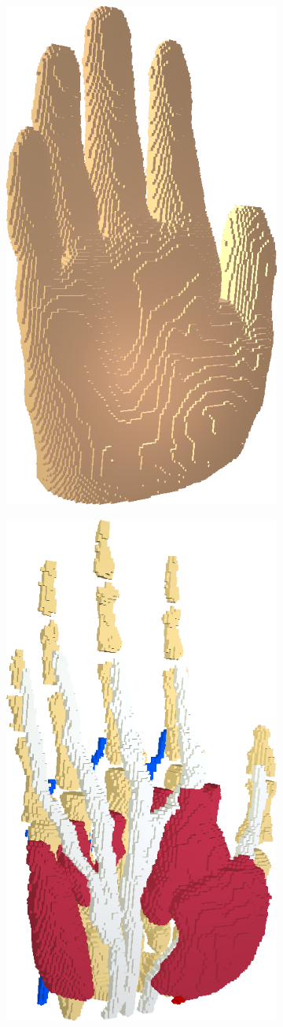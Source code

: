 {{{			\begin{figure}[!h]
			    \centering
    			\begin{subfigure}{.49\linewidth}
    			    \centering
    			    \includegraphics[width=.6\linewidth]{img/hand.png}
    			    \label{img:hand}
			    \end{subfigure}
			    \hfill
    			\begin{subfigure}{.49\linewidth}
    			    \centering
    			    \includegraphics[width=.6\linewidth]{img/hand_less.png}

\end{subfigure}
\end{figure}}}}
